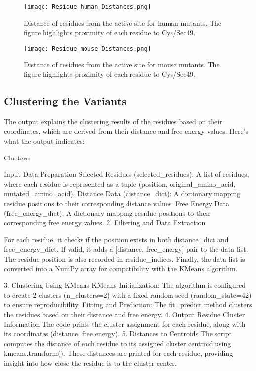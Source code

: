 \documentclass{article}
\begin{document}
\begin{figure}[H]
    \centering
    \texttt{[image: Residue\_human\_Distances.png]}
    \caption{Distance of residues from the active site for human mutants. The figure highlights proximity of each residue to Cys/Sec49.}
    \label{fig:human_distances}
\end{figure}

\begin{figure}[H]
    \centering
    \texttt{[image: Residue\_mouse\_Distances.png]}
    \caption{Distance of residues from the active site for mouse mutants. The figure highlights proximity of each residue to Cys/Sec49.}
    \label{fig:mouse_distances}
\end{figure}

\FloatBarrier %

\subsection{Clustering the Variants}
The output explains the clustering results of the residues based on their coordinates, which are derived from their distance and free energy values. Here's what the output indicates:

Clusters:

Input Data Preparation
Selected Residues (selected_residues): A list of residues, where each residue is represented as a tuple (position, original_amino_acid, mutated_amino_acid).
Distance Data (distance_dict): A dictionary mapping residue positions to their corresponding distance values.
Free Energy Data (free_energy_dict): A dictionary mapping residue positions to their corresponding free energy values.
2. Filtering and Data Extraction

For each residue, it checks if the position exists in both distance_dict and free_energy_dict.
If valid, it adds a [distance, free_energy] pair to the data list.
The residue position is also recorded in residue_indices.
Finally, the data list is converted into a NumPy array for compatibility with the KMeans algorithm.

3. Clustering Using KMeans
KMeans Initialization: The algorithm is configured to create 2 clusters (n_clusters=2) with a fixed random seed (random_state=42) to ensure reproducibility.
Fitting and Prediction: The fit_predict method clusters the residues based on their distance and free energy.
4. Output Residue Cluster Information
The code prints the cluster assignment for each residue, along with its coordinates (distance, free energy).
5. Distances to Centroids
The script computes the distance of each residue to its assigned cluster centroid using kmeans.transform().
These distances are printed for each residue, providing insight into how close the residue is to the cluster center.
\end{document}
